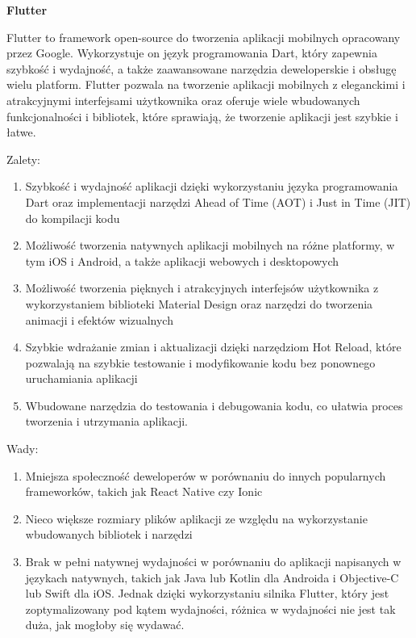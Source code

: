 \documentclass[12pt, a4paper, twoside, openany]{book}
\begin{document}
\textbf{Flutter\\}

Flutter to framework open-source do tworzenia aplikacji mobilnych opracowany przez Google. Wykorzystuje on język programowania Dart, który zapewnia szybkość i wydajność, a także zaawansowane narzędzia deweloperskie i obsługę wielu platform. Flutter pozwala na tworzenie aplikacji mobilnych z eleganckimi i atrakcyjnymi interfejsami użytkownika oraz oferuje wiele wbudowanych funkcjonalności i bibliotek, które sprawiają, że tworzenie aplikacji jest szybkie i łatwe.
    
Zalety:
\begin{enumerate}[label=--]
    \item Szybkość i wydajność aplikacji dzięki wykorzystaniu języka programowania Dart oraz implementacji narzędzi Ahead of Time (AOT) i Just in Time (JIT) do kompilacji kodu
    \item Możliwość tworzenia natywnych aplikacji mobilnych na różne platformy, w tym iOS i Android, a także aplikacji webowych i desktopowych
    \item Możliwość tworzenia pięknych i atrakcyjnych interfejsów użytkownika z wykorzystaniem biblioteki Material Design oraz narzędzi do tworzenia animacji i efektów wizualnych
    \item Szybkie wdrażanie zmian i aktualizacji dzięki narzędziom Hot Reload, które pozwalają na szybkie testowanie i modyfikowanie kodu bez ponownego uruchamiania aplikacji
    \item Wbudowane narzędzia do testowania i debugowania kodu, co ułatwia proces tworzenia i utrzymania aplikacji.
\end{enumerate}

Wady:
\begin{enumerate}[label=--]
 \item Mniejsza społeczność deweloperów w porównaniu do innych popularnych frameworków, takich jak React Native czy Ionic
 \item Nieco większe rozmiary plików aplikacji ze względu na wykorzystanie wbudowanych bibliotek i narzędzi
 \item Brak w pełni natywnej wydajności w porównaniu do aplikacji napisanych w językach natywnych, takich jak Java lub Kotlin dla Androida i Objective-C lub Swift dla iOS. Jednak dzięki wykorzystaniu silnika Flutter, który jest zoptymalizowany pod kątem wydajności, różnica w wydajności nie jest tak duża, jak mogłoby się wydawać.
\end{enumerate}
\end{document}
